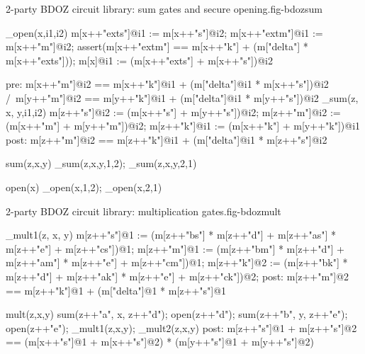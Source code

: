 \begin{fpfig}[t]{2-party BDOZ circuit library: sum gates and secure opening.}{fig-bdozsum}
{\footnotesize
\begin{verbatimtab}
  _open(x,i1,i2){
    m[x++"exts"]@i1 := m[x++"s"]@i2;
    m[x++"extm"]@i1 := m[x++"m"]@i2;
    assert(m[x++"extm"] == m[x++"k"] + (m["delta"] * m[x++"exts"]));
    m[x]@i1 := (m[x++"exts"] + m[x++"s"])@i2
  }
  
  pre: { m[x++"m"]@i2 == m[x++"k"]@i1 + (m["delta"]@i1 * m[x++"s"])@i2 /\
         m[y++"m"]@i2 == m[y++"k"]@i1 + (m["delta"]@i1 * m[y++"s"])@i2 }
  _sum(z, x, y,i1,i2) {
      m[z++"s"]@i2 := (m[x++"s"] + m[y++"s"])@i2;
      m[z++"m"]@i2 := (m[x++"m"] + m[y++"m"])@i2;
      m[z++"k"]@i1 := (m[x++"k"] + m[y++"k"])@i1
  }
  post: { m[z++"m"]@i2 == m[z++"k"]@i1 + (m["delta"]@i1 * m[z++"s"]@i2 } 
  
  sum(z,x,y) { _sum(z,x,y,1,2); _sum(z,x,y,2,1) }

  open(x) { _open(x,1,2); _open(x,2,1) }
\end{verbatimtab}
}
\end{fpfig}

\begin{fpfig}[t]{2-party BDOZ circuit library: multiplication gates.}{fig-bdozmult}
{\footnotesize
\begin{verbatimtab}
  _mult1(z, x, y) {
      m[z++"s"]@1 :=
        (m[z++"bs"] * m[z++"d"] + m[z++"as"] * m[z++"e"] + m[z++"cs"])@1;
      m[z++"m"]@1 :=
        (m[z++"bm"] * m[z++"d"] + m[z++"am"] * m[z++"e"] + m[z++"cm"])@1;
      m[z++"k"]@2 :=
        (m[z++"bk"] * m[z++"d"] + m[z++"ak"] * m[z++"e"] + m[z++"ck"])@2;    
  }
  post: { m[z++"m"]@2 == m[z++"k"]@1 + (m["delta"]@1 * m[z++"s"]@1 }

  mult(z,x,y) {
      sum(z++"a", x, z++"d");
      open(z++"d");
      sum(z++"b", y, z++"e");
      open(z++"e"); 
      _mult1(z,x,y); _mult2(z,x,y)
  }
  post: {  m[z++"s"]@1 + m[z++"s"]@2 ==
          (m[x++"s"]@1 + m[x++"s"]@2) * (m[y++"s"]@1 + m[y++"s"]@2)} 
  
\end{verbatimtab}
}
\end{fpfig}

\begin{comment}
      m[z++"ds"]@1 as m[x++"s"]@2 + r[z++"as"]@2;
      m[z++"ds"]@2 as m[x++"s"]@1 + r[z++"as"]@1;
      m[z++"ms"]@2 as m[z++"k"]@1 + (m["delta"]@1 * m[z++"ds"]@2);
      m[z++"ms"]@1 as m[z++"k"]@2 + (m["delta"]@2 * m[z++"ds"]@1);
\end{comment}
